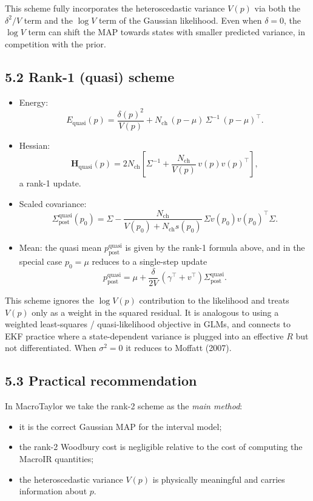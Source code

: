 \documentclass[11pt]{article}
\begin{document}
This scheme fully incorporates the heteroscedastic variance $V(p)$ via
both the $\delta^2/V$ term and the $\log V$ term of the Gaussian
likelihood.  Even when $\delta=0$, the $\log V$ term can shift the MAP
towards states with smaller predicted variance, in competition with
the prior.

\subsection*{5.2 Rank-1 (quasi) scheme}

\begin{itemize}
  \item Energy:
    \[
      E_{\text{quasi}}(p)
      =
      \frac{\delta(p)^2}{V(p)}
      + N_{\text{ch}}\,(p-\mu)\,\Sigma^{-1}\,(p-\mu)^\top.
    \]
  \item Hessian:
    \[
      \mathbf{H}_{\text{quasi}}(p)
      =
      2N_{\text{ch}}
      \left[
        \Sigma^{-1}
        + \frac{N_{\text{ch}}}{V(p)}\,v(p)v(p)^\top
      \right],
    \]
    a rank-1 update.
  \item Scaled covariance:
    \[
      \Sigma_{\text{post}}^{\text{quasi}}(p_0)
      =
      \Sigma
      -
      \frac{N_{\text{ch}}}{V(p_0) + N_{\text{ch}} s(p_0)}\,
      \Sigma v(p_0)v(p_0)^\top\Sigma.
    \]
  \item Mean: the quasi mean $p_{\text{post}}^{\text{quasi}}$ is given
    by the rank-1 formula above, and in the special case $p_0=\mu$
    reduces to a single-step update
    \[
      p_{\text{post}}^{\text{quasi}}
      =
      \mu
      + \frac{\delta}{2V}\,(\gamma^\top + v^\top)
        \Sigma_{\text{post}}^{\text{quasi}}.
    \]
\end{itemize}

This scheme ignores the $\log V(p)$ contribution to the likelihood and
treats $V(p)$ only as a weight in the squared residual.  It is
analogous to using a weighted least-squares / quasi-likelihood
objective in GLMs, and connects to EKF practice where a
state-dependent variance is plugged into an effective $R$ but not
differentiated.  When $\sigma^2 = 0$ it reduces to Moffatt (2007).

\subsection*{5.3 Practical recommendation}

In MacroTaylor we take the rank-2 scheme as the \emph{main method}:
\begin{itemize}
  \item it is the correct Gaussian MAP for the interval model;
  \item the rank-2 Woodbury cost is negligible relative to the cost of
        computing the MacroIR quantities;
  \item the heteroscedastic variance $V(p)$ is physically meaningful
        and carries information about $p$.
\end{itemize}
\end{document}
